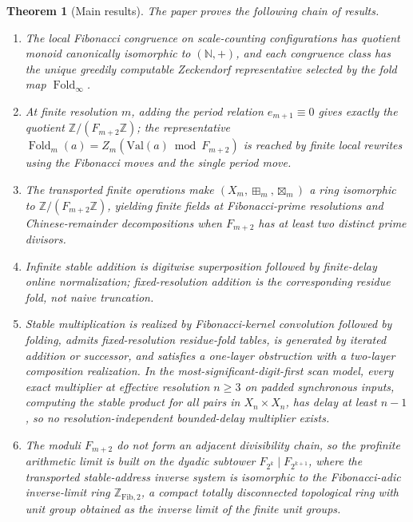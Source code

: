 \documentclass[12pt,a4paper]{article}
\theoremstyle{plain}
\newtheorem{theorem}{Theorem}[section]
\theoremstyle{definition}
\numberwithin{equation}{section}
\newcommand{\ZZ}{\mathbb{Z}}
\newcommand{\NN}{\mathbb{N}}
\newcommand{\Fold}{\operatorname{Fold}}
\begin{document}
\begin{theorem}[Main results]\label{thm:main-results-package}
The paper proves the following chain of results.
\begin{enumerate}[label=\textup{(\roman*)}]
  \item The local Fibonacci congruence on scale-counting configurations has quotient monoid canonically isomorphic to \((\NN,+)\), and each congruence class has the unique greedily computable Zeckendorf representative selected by the fold map \(\Fold_\infty\).
  \item At finite resolution \(m\), adding the period relation \(e_{m+1}\equiv0\) gives exactly the quotient \(\ZZ/(F_{m+2}\ZZ)\); the representative \(\Fold_m(a)=Z_m(\mathrm{Val}(a)\bmod F_{m+2})\) is reached by finite local rewrites using the Fibonacci moves and the single period move.
  \item The transported finite operations make \((X_m,\boxplus_m,\boxtimes_m)\) a ring isomorphic to \(\ZZ/(F_{m+2}\ZZ)\), yielding finite fields at Fibonacci-prime resolutions and Chinese-remainder decompositions when \(F_{m+2}\) has at least two distinct prime divisors.
  \item Infinite stable addition is digitwise superposition followed by finite-delay online normalization; fixed-resolution addition is the corresponding residue fold, not naive truncation.
  \item Stable multiplication is realized by Fibonacci-kernel convolution followed by folding, admits fixed-resolution residue-fold tables, is generated by iterated addition or successor, and satisfies a one-layer obstruction with a two-layer composition realization. In the most-significant-digit-first scan model, every exact multiplier at effective resolution \(n\ge3\) on padded synchronous inputs, computing the stable product for all pairs in \(X_n\times X_n\), has delay at least \(n-1\), so no resolution-independent bounded-delay multiplier exists.
  \item The moduli \(F_{m+2}\) do not form an adjacent divisibility chain, so the profinite arithmetic limit is built on the dyadic subtower \(F_{2^k}\mid F_{2^{k+1}}\), where the transported stable-address inverse system is isomorphic to the Fibonacci-adic inverse-limit ring \(\ZZ_{\mathrm{Fib},2}\), a compact totally disconnected topological ring with unit group obtained as the inverse limit of the finite unit groups.
\end{enumerate}
\end{theorem}
\end{document}
